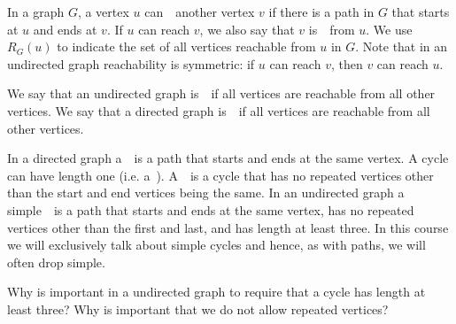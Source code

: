 \begin{cluster}
\label{grp:def:bg::graphs::reachability-and-connectivity}

\begin{definition}
\label{def:bg::graphs::reachability-and-connectivity}
In a graph $G$, a vertex $u$ can~~another vertex $v$
if there is a path in $G$ that starts at $u$ and ends at $v$.
If $u$ can reach $v$, we also say that $v$ is~~from $u$.
We use $R_G(u)$ to indicate the set of all vertices reachable from $u$
in $G$.
Note that in an undirected graph reachability is symmetric: if $u$ can reach $v$, then $v$ can reach $u$.

We say that an undirected graph is~~if all vertices are reachable from all other vertices.  
We say that a directed graph is~~if all vertices are reachable from all other vertices.

\end{definition}
\end{cluster}

\begin{cluster}
\label{grp:def:bg::graphs::cycles}

\begin{definition}[Cycles]
\label{def:bg::graphs::cycles}
In a directed graph a~~is a path that starts and ends at
the same vertex.    A cycle can have length one (i.e. a~).
A~~is a
cycle that has no repeated vertices other than the start and end
vertices being the same.
In an undirected graph a simple~~is a path that
starts and ends at the same vertex, has no repeated vertices other
than the first and last, and has length at least three.
In this course we will exclusively talk
about simple cycles and hence, as with paths, we will often drop
simple.

\end{definition}
\end{cluster}

\begin{cluster}
\label{grp:xrcs:bg::graphs::undirected}

\begin{exercise}
\label{xrcs:bg::graphs::undirected}
Why is important in a undirected graph to require that a cycle has
length at least three?  Why is important that we do not allow repeated
vertices?

\end{exercise}
\end{cluster}

